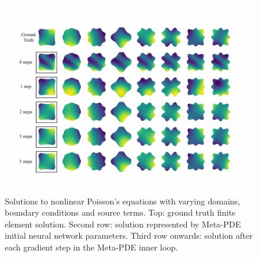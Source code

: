 \begin{figure}[htbp]
  \centering
 \includegraphics[width=0.8\linewidth]{figures/poisson_meta.pdf}
\caption{Solutions to nonlinear Poisson's equations with varying domains, boundary conditions and source terms. Top: ground truth finite element solution. Second row: solution represented by Meta-PDE initial neural network parameters. Third row onwards: solution after each gradient step in the Meta-PDE inner loop.}
\label{fig:results_per_step}
\end{figure}



